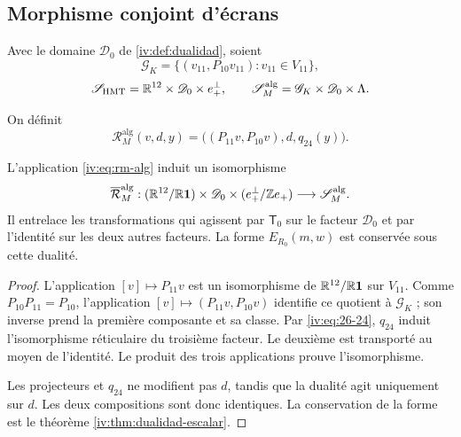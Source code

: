 \begingroup\fontsize{10}{11.7}\selectfont
\setlength{\parskip}{2pt}\setlength{\abovedisplayskip}{5pt}\setlength{\belowdisplayskip}{5pt}
\subsection{Morphisme conjoint d’écrans
}

Avec le domaine \(\mathscr D_0\) de \ref{iv:def:dualidad},
soient
\[
 \mathscr G_K=\{(v_{11},P_{10}v_{11}):v_{11}\in V_{11}\},
\]
\[
 \mathscr S_{\mathrm{HMT}}=\mathbb R^{12}\times\mathscr D_0\times e_+^\perp,
 \qquad
 \mathscr S_M^{\mathrm{alg}}=\mathscr G_K\times\mathscr D_0\times\Lambda.
\]
\begin{definition}
\label{iv:def:rm-alg}
On définit
\begin{equation}
 \mathcal R_M^{\mathrm{alg}}(v,d,y)
 =\bigl((P_{11}v,P_{10}v),d,q_{24}(y)\bigr).
 \label{iv:eq:rm-alg}
\end{equation}
\end{definition}

\begin{theorem}
\label{iv:thm:pantallas-isomorfas}
\label{thm:k-pantallas-coordinadas}
L’application \eqref{iv:eq:rm-alg} induit un isomorphisme
\[
 \overline{\mathcal R}_M^{\mathrm{alg}}:
 (\mathbb R^{12}/\mathbb R\mathbf1)\times\mathscr D_0
 \times(e_+^\perp/\mathbb Z e_+)
 \longrightarrow\mathscr S_M^{\mathrm{alg}}.
\]
Il entrelace les transformations qui agissent par \(\mathsf T_0\)
sur le facteur \(\mathscr D_0\) et par l’identité sur les
deux autres facteurs. La forme \(E_{R_0}(m,w)\) est conservée
sous cette dualité.

\end{theorem}
\begin{proof}
L’application \([v]\mapsto P_{11}v\) est un isomorphisme
de \(\mathbb R^{12}/\mathbb R\mathbf1\) sur \(V_{11}\).
Comme \(P_{10}P_{11}=P_{10}\), l’application
\([v]\mapsto(P_{11}v,P_{10}v)\) identifie ce quotient
à \(\mathscr G_K\) ; son inverse prend la première composante
et sa classe. Par \eqref{iv:eq:26-24}, \(q_{24}\) induit
l’isomorphisme réticulaire du troisième facteur. Le deuxième est
transporté au moyen de l’identité. Le produit des trois
applications prouve l’isomorphisme.

Les projecteurs et \(q_{24}\) ne modifient pas \(d\), tandis que
la dualité agit uniquement sur \(d\). Les deux
compositions sont donc identiques. La conservation de la forme
est le théorème \ref{iv:thm:dualidad-escalar}.
\end{proof}

